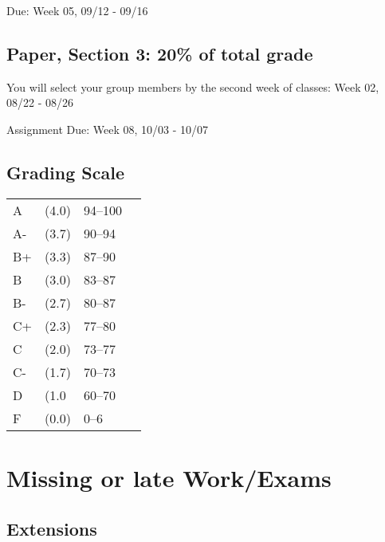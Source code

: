 \documentclass[11pt,]{article}
\begin{document}
Due: Week 05, 09/12 - 09/16

\subsection{Paper, Section 3: 20\% of total
grade}\label{paper-section-3-20-of-total-grade}

You will select your group members by the second week of classes: Week
02, 08/22 - 08/26

Assignment Due: Week 08, 10/03 - 10/07

\subsection{Grading Scale}\label{grading-scale}

\begin{longtable}[]{@{}llll@{}}
\toprule\noalign{}
\endhead
\bottomrule\noalign{}
\endlastfoot
A & (4.0) & 94--100 & \\
A- & (3.7) & 90--94 & \\
B+ & (3.3) & 87--90 & \\
B & (3.0) & 83--87 & \\
B- & (2.7) & 80--87 & \\
C+ & (2.3) & 77--80 & \\
C & (2.0) & 73--77 & \\
C- & (1.7) & 70--73 & \\
D & (1.0 & 60--70 & \\
F & (0.0) & 0--6 & \\
\end{longtable}

\section{Missing or late Work/Exams}\label{missing-or-late-workexams}

\subsection{Extensions}\label{extensions}
\end{document}
